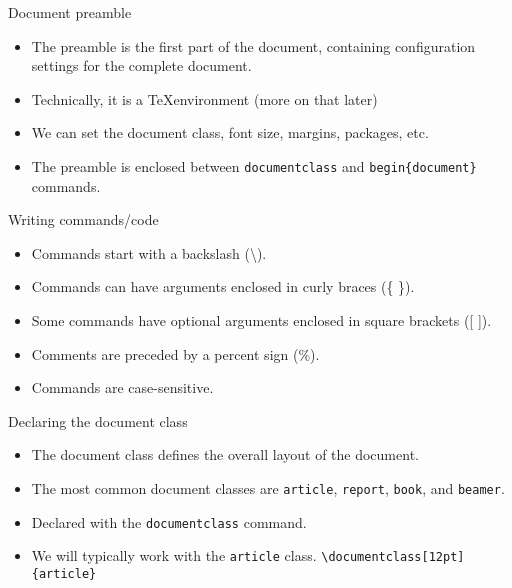 \documentclass[t,12pt,xcolor=dvipsnames]{beamer}
\begin{document}
\begin{frame}{Document preamble}
    \begin{itemize}
        \item The preamble is the first part of the document, containing configuration settings for the complete document.
        \item Technically, it is a \TeX environment (more on that later)
        \item We can set the document class, font size, margins, packages, etc.
        \item The preamble is enclosed between \texttt{documentclass} and \texttt{begin\{document\}} commands.
    \end{itemize}
\end{frame}

\begin{frame}{Writing commands/code}
    \begin{itemize}
        \item Commands start with a backslash (\textbackslash).
        \item Commands can have arguments enclosed in curly braces (\{ \}).
        \item Some commands have optional arguments enclosed in square brackets ([ ]).
        \item Comments are preceded by a percent sign (\%).
        \item Commands are case-sensitive.
    \end{itemize}
\end{frame}

\begin{frame}{Declaring the document class}
    \begin{itemize}
        \item The document class defines the overall layout of the document.
        \item The most common document classes are \texttt{article}, \texttt{report}, \texttt{book}, and \texttt{beamer}.
        \item Declared with the \texttt{documentclass} command.
        \item We will typically work with the \texttt{article} class.
    \texttt{\textbackslash documentclass[12pt]\{article\}}
    \end{itemize}
\end{frame}
\end{document}
